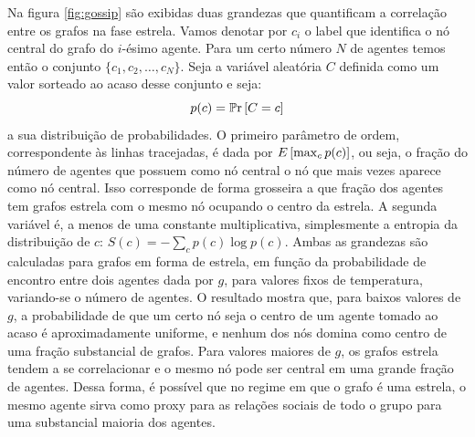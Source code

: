 Na figura \ref{fig:gossip} são exibidas duas grandezas que quantificam a correlação entre os grafos na fase estrela. Vamos denotar por $c_i$ o label que identifica o nó central do grafo do $i$-ésimo agente. Para um certo número $N$ de agentes temos então o conjunto $\{c_1, c_2, \ldots, c_N\}$. Seja a variável aleatória $C$ definida como um valor sorteado ao acaso desse conjunto e seja:
\[
 p(c) = \mathbb{P}\mathrm{r}\left[C = c\right]
\]
a sua distribuição de probabilidades. O primeiro parâmetro de ordem, correspondente às linhas tracejadas, é dada por $E\left[\max_{c} p(c)\right]$, ou seja, o fração do número de agentes que possuem como nó central o nó que mais vezes aparece como nó central. Isso corresponde de forma grosseira a que fração dos agentes tem grafos estrela com o mesmo nó ocupando o centro da estrela. A segunda variável é, a menos de uma constante multiplicativa, simplesmente a entropia da distribuição de $c$: $S(c) = -\sum_{c} p(c) \log p(c)$. Ambas as grandezas são calculadas para grafos em forma de estrela, em função da probabilidade de encontro entre dois agentes dada por $g$, para valores fixos de temperatura, variando-se o número de agentes. O resultado mostra que, para baixos valores de $g$, a probabilidade de que um certo nó seja o centro de um agente tomado ao acaso é aproximadamente uniforme, e nenhum dos nós domina como centro de uma fração substancial de grafos. Para valores maiores de $g$, os grafos estrela tendem a se correlacionar e o mesmo nó pode ser central em uma grande fração de agentes. Dessa forma, é possível que no regime em que o grafo é uma estrela, o mesmo agente sirva como proxy para as relações sociais de todo o grupo para uma substancial maioria dos agentes.

